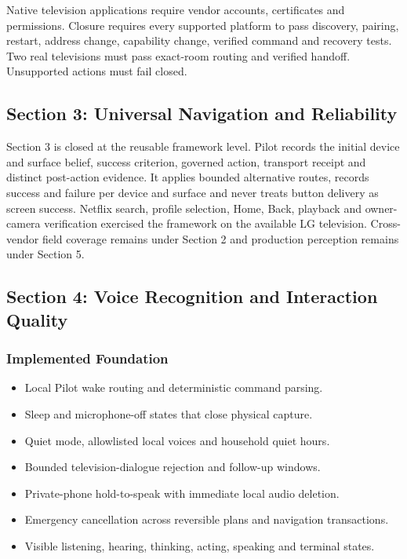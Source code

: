 Native television applications require vendor accounts, certificates and permissions.
Closure requires every supported platform to pass discovery, pairing, restart,
address change, capability change, verified command and recovery tests. Two real
televisions must pass exact-room routing and verified handoff. Unsupported actions
must fail closed.

\subsection{Section 3: Universal Navigation and Reliability}

Section 3 is closed at the reusable framework level. Pilot records the initial
device and surface belief, success criterion, governed action, transport receipt and
distinct post-action evidence. It applies bounded alternative routes, records success
and failure per device and surface and never treats button delivery as screen success.
Netflix search, profile selection, Home, Back, playback and owner-camera verification
exercised the framework on the available LG television. Cross-vendor field coverage
remains under Section 2 and production perception remains under Section 5.

\subsection{Section 4: Voice Recognition and Interaction Quality}

\subsubsection{Implemented Foundation}

\begin{itemize}
  \item Local Pilot wake routing and deterministic command parsing.
  \item Sleep and microphone-off states that close physical capture.
  \item Quiet mode, allowlisted local voices and household quiet hours.
  \item Bounded television-dialogue rejection and follow-up windows.
  \item Private-phone hold-to-speak with immediate local audio deletion.
  \item Emergency cancellation across reversible plans and navigation transactions.
  \item Visible listening, hearing, thinking, acting, speaking and terminal states.
\end{itemize}

